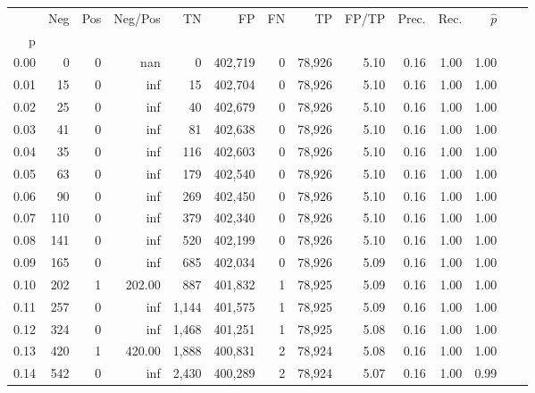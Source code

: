 \begin{tabular}{rrrrrrrrrrrrrr}
\toprule
{} &     Neg &    Pos &  Neg/Pos &       TN &       FP &      FN &      TP & FP/TP & Prec. &  Rec. & $\hat{p}$ \\
p    &         &        &          &          &          &         &         &       &       &       &           \\
\midrule
0.00 &       0 &      0 &      nan &        0 &  402,719 &       0 &  78,926 &  5.10 &  0.16 &  1.00 &      1.00 \\
0.01 &      15 &      0 &      inf &       15 &  402,704 &       0 &  78,926 &  5.10 &  0.16 &  1.00 &      1.00 \\
0.02 &      25 &      0 &      inf &       40 &  402,679 &       0 &  78,926 &  5.10 &  0.16 &  1.00 &      1.00 \\
0.03 &      41 &      0 &      inf &       81 &  402,638 &       0 &  78,926 &  5.10 &  0.16 &  1.00 &      1.00 \\
0.04 &      35 &      0 &      inf &      116 &  402,603 &       0 &  78,926 &  5.10 &  0.16 &  1.00 &      1.00 \\
0.05 &      63 &      0 &      inf &      179 &  402,540 &       0 &  78,926 &  5.10 &  0.16 &  1.00 &      1.00 \\
0.06 &      90 &      0 &      inf &      269 &  402,450 &       0 &  78,926 &  5.10 &  0.16 &  1.00 &      1.00 \\
0.07 &     110 &      0 &      inf &      379 &  402,340 &       0 &  78,926 &  5.10 &  0.16 &  1.00 &      1.00 \\
0.08 &     141 &      0 &      inf &      520 &  402,199 &       0 &  78,926 &  5.10 &  0.16 &  1.00 &      1.00 \\
0.09 &     165 &      0 &      inf &      685 &  402,034 &       0 &  78,926 &  5.09 &  0.16 &  1.00 &      1.00 \\
0.10 &     202 &      1 &   202.00 &      887 &  401,832 &       1 &  78,925 &  5.09 &  0.16 &  1.00 &      1.00 \\
0.11 &     257 &      0 &      inf &    1,144 &  401,575 &       1 &  78,925 &  5.09 &  0.16 &  1.00 &      1.00 \\
0.12 &     324 &      0 &      inf &    1,468 &  401,251 &       1 &  78,925 &  5.08 &  0.16 &  1.00 &      1.00 \\
0.13 &     420 &      1 &   420.00 &    1,888 &  400,831 &       2 &  78,924 &  5.08 &  0.16 &  1.00 &      1.00 \\
0.14 &     542 &      0 &      inf &    2,430 &  400,289 &       2 &  78,924 &  5.07 &  0.16 &  1.00 &      0.99 \\

\end{tabular}
